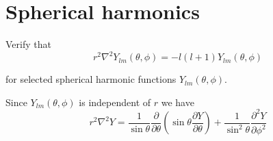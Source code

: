 

\section*{Spherical harmonics}

Verify that
\begin{equation*}
r^2\nabla^2Y_{lm}(\theta,\phi)=-l(l+1)Y_{lm}(\theta,\phi)
\tag{1}
\end{equation*}

for selected spherical harmonic functions $Y_{lm}(\theta,\phi)$.

\bigskip
Since $Y_{lm}(\theta,\phi)$ is independent of $r$ we have
\begin{equation*}
r^2\nabla^2Y=\frac{1}{\sin\theta}\frac{\partial}{\partial\theta}
\left(\sin\theta\frac{\partial Y}{\partial\theta}\right)
+\frac{1}{\sin^2\theta}\frac{\partial^2Y}{\partial\phi^2}
\end{equation*}


